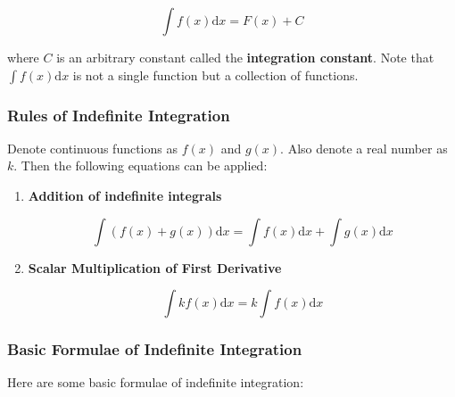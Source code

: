 \documentclass[a4paper,12pt]{article}
\newcommand{\s}{\vspace{1mm}}
\newcommand{\diff}{\mathrm{d}}
\newenvironment{alist}{ %
\begin{enumerate}[label=(\alph*)]
}{
\end{enumerate}
}
\begin{document}
$$\int f(x)\diff x=F(x)+C$$\s

where $C$ is an arbitrary constant called the \textbf{integration constant}. Note that $\int f(x)\diff x$ is not a single function but a collection of functions.

\subsubsection{Rules of Indefinite Integration}
Denote continuous functions as $f(x)$ and $g(x)$. Also denote a real number as $k$. Then the following equations can be applied:

\begin{alist}
  \item \textbf{Addition of indefinite integrals}

  $$\int(f(x)+g(x))\diff x=\int f(x)\diff x+\int g(x)\diff x$$

  \item \textbf{Scalar Multiplication of First Derivative}

  $$\int kf(x)\diff x=k\int f(x)\diff x$$
\end{alist}

\subsubsection{Basic Formulae of Indefinite Integration}
Here are some basic formulae of indefinite integration:
\end{document}
